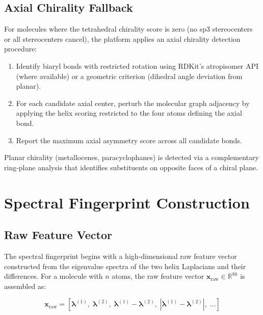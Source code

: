 \documentclass[11pt,a4paper]{article}
\begin{document}
\subsection{Axial Chirality Fallback}

For molecules where the tetrahedral chirality score is zero (no sp3 stereocenters
or all stereocenters cancel), the platform applies an axial chirality detection
procedure:

\begin{enumerate}[leftmargin=1.5em]
  \item Identify biaryl bonds with restricted rotation using RDKit's atropisomer
    API (where available) or a geometric criterion (dihedral angle deviation from
    planar).
  \item For each candidate axial center, perturb the molecular graph adjacency
    by applying the helix scoring restricted to the four atoms defining the
    axial bond.
  \item Report the maximum axial asymmetry score across all candidate bonds.
\end{enumerate}

Planar chirality (metallocenes, paracyclophanes) is detected via a complementary
ring-plane analysis that identifies substituents on opposite faces of a chiral
plane.

\newpage

\section{Spectral Fingerprint Construction}
\label{sec:fingerprint}

\subsection{Raw Feature Vector}

The spectral fingerprint begins with a high-dimensional raw feature vector
constructed from the eigenvalue spectra of the two helix Laplacians and their
differences. For a molecule with $n$ atoms, the raw feature vector
$\mathbf{x}_{\text{raw}} \in \mathbb{R}^{8k}$ is assembled as:

\begin{equation}
  \mathbf{x}_{\text{raw}} = \left[
    \boldsymbol{\lambda}^{(1)},\;
    \boldsymbol{\lambda}^{(2)},\;
    \boldsymbol{\lambda}^{(1)} - \boldsymbol{\lambda}^{(2)},\;
    \left|\boldsymbol{\lambda}^{(1)} - \boldsymbol{\lambda}^{(2)}\right|,\;
    \ldots
  \right]
\end{equation}
\end{document}
